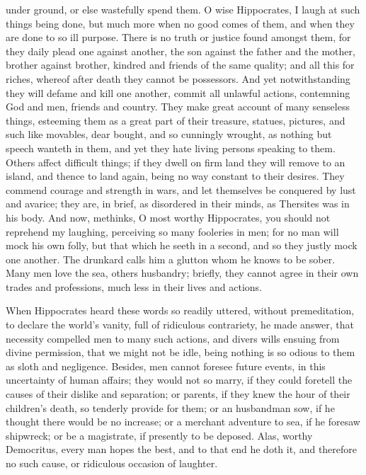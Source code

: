 under ground, or else wastefully spend them. O wise Hippocrates, I laugh at
such things being done, but much more when no good comes of them, and when they
are done to so ill purpose. There is no truth or justice found amongst them,
for they daily plead one against another, the son against
the father and the mother, brother against brother, kindred and friends of the
same quality; and all this for riches, whereof after death they cannot be
possessors. And yet notwithstanding they will defame and kill one another,
commit all unlawful actions, contemning God and men, friends and country. They
make great account of many senseless things, esteeming them as a great part of
their treasure, statues, pictures, and such like movables, dear bought, and so
cunningly wrought, as nothing but speech wanteth in them,
and yet they hate living persons speaking to them.
Others affect difficult things; if they dwell on firm land
they will remove to an island, and thence to land again, being no way constant
to their desires. They commend courage and strength in wars, and let themselves
be conquered by lust and avarice; they are, in brief, as disordered in their
minds, as Thersites was in his body. And now, methinks, O most worthy
Hippocrates, you should not reprehend my laughing, perceiving so many fooleries
in men; for no man will mock his own folly, but that which
he seeth in a second, and so they justly mock one another. The drunkard calls
him a glutton whom he knows to be sober. Many men love the sea, others
husbandry; briefly, they cannot agree in their own trades and professions, much
less in their lives and actions.

When Hippocrates heard these words so readily uttered, without premeditation,
to declare the world's vanity, full of ridiculous contrariety, he made answer,
that necessity compelled men to many such actions, and divers wills ensuing
from divine permission, that we might not be idle, being nothing is so odious
to them as sloth and negligence. Besides, men cannot foresee future events, in
this uncertainty of human affairs; they would not so marry, if they could
foretell the causes of their dislike and separation; or parents, if they knew
the hour of their children's death, so tenderly provide for them; or an
husbandman sow, if he thought there would be no increase; or a merchant
adventure to sea, if he foresaw shipwreck; or be a magistrate, if presently to
be deposed. Alas, worthy Democritus, every man hopes the best, and to that end
he doth it, and therefore no such cause, or ridiculous occasion of laughter.

